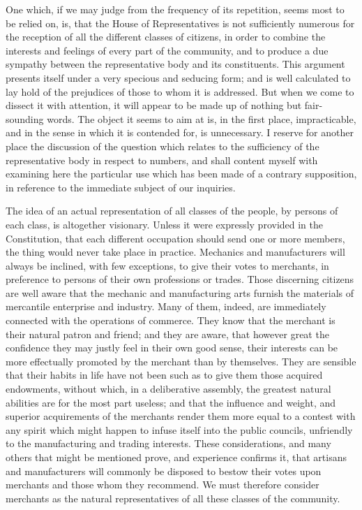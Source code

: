 One which, if we may judge from the frequency of its repetition, seems most to be relied on, is, that the House of Representatives is not sufficiently numerous for the reception of all the different classes of citizens, in order to combine the interests and feelings of every part of the community, and to produce a due sympathy between the representative body and its constituents. This argument presents itself under a very specious and seducing form; and is well calculated to lay hold of the prejudices of those to whom it is addressed. But when we come to dissect it with attention, it will appear to be made up of nothing but fair-sounding words. The object it seems to aim at is, in the first place, impracticable, and in the sense in which it is contended for, is unnecessary. I reserve for another place the discussion of the question which relates to the sufficiency of the representative body in respect to numbers, and shall content myself with examining here the particular use which has been made of a contrary supposition, in reference to the immediate subject of our inquiries.

The idea of an actual representation of all classes of the people, by persons of each class, is altogether visionary. Unless it were expressly provided in the Constitution, that each different occupation should send one or more members, the thing would never take place in practice. Mechanics and manufacturers will always be inclined, with few exceptions, to give their votes to merchants, in preference to persons of their own professions or trades. Those discerning citizens are well aware that the mechanic and manufacturing arts furnish the materials of mercantile enterprise and industry. Many of them, indeed, are immediately connected with the operations of commerce. They know that the merchant is their natural patron and friend; and they are aware, that however great the confidence they may justly feel in their own good sense, their interests can be more effectually promoted by the merchant than by themselves. They are sensible that their habits in life have not been such as to give them those acquired endowments, without which, in a deliberative assembly, the greatest natural abilities are for the most part useless; and that the influence and weight, and superior acquirements of the merchants render them more equal to a contest with any spirit which might happen to infuse itself into the public councils, unfriendly to the manufacturing and trading interests. These considerations, and many others that might be mentioned prove, and experience confirms it, that artisans and manufacturers will commonly be disposed to bestow their votes upon merchants and those whom they recommend. We must therefore consider merchants as the natural representatives of all these classes of the community.

